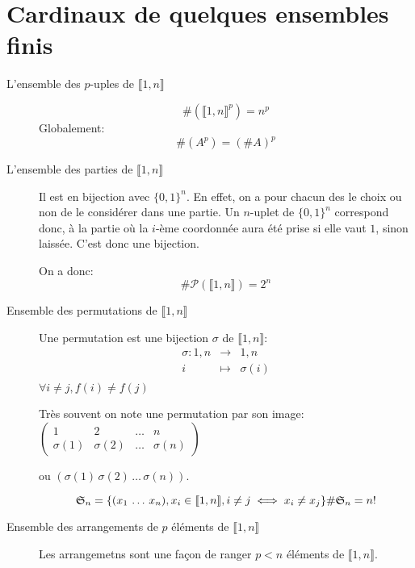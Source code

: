 \section{Cardinaux de quelques ensembles finis}
  \begin{description}
    \item[L'ensemble des $p$-uples de $\llbracket 1,n \rrbracket$]
      \[
        \#(\llbracket 1,n \rrbracket ^p) = n^p
      \]
      Globalement:
      \[
        \#(A^p) = (\#A)^p
      \]

      \item[L'ensemble des parties de $\llbracket 1,n \rrbracket$]
      Il est en bijection avec $\{0,1\}^n$. En effet, on a pour chacun des
      le choix ou non de le considérer dans une partie. Un $n$-uplet
      de $\{0,1\}^n$ correspond donc, à la partie où la $i$-ème coordonnée aura
      été prise si elle vaut $1$, sinon laissée. C'est donc une bijection.


      On a donc: \[
        \#\mathcal{P}(\llbracket 1,n \rrbracket) = 2^n
      \]


      \item[Ensemble des permutations de $\llbracket 1,n \rrbracket$]
      Une permutation est une bijection $\sigma$ de $\llbracket 1,n \rrbracket$:
      \begin{eqnarray*}
        \sigma :  1,n  &\rightarrow&  1,n \\
                             i             &\mapsto& \sigma(i)\\
      \end{eqnarray*}
      $\forall i\neq j, f(i)\neq f(j)$

      Très souvent on note une permutation par son image:
      $
      \begin{pmatrix}
        1 & 2 & \dots & n\\
        \sigma(1) & \sigma(2) & \dots & \sigma(n)
      \end{pmatrix}
      $

      ou $(\sigma(1)\, \sigma(2)\, \dots\, \sigma(n))$.

      \[
        \mathfrak{S}_n = \{(x_1\, \dots\, x_n), x_i\in\llbracket 1,n\rrbracket, i\neq j \iff x_i\neq x_j\}\\
        \#\mathfrak{S}_n = n!
      \]

      \item[Ensemble des arrangements de $p$ éléments de $\llbracket 1,n \rrbracket$]
      Les arrangemetns sont une façon de ranger $p<n$ éléments de $\llbracket 1,n \rrbracket$.


\end{description}
